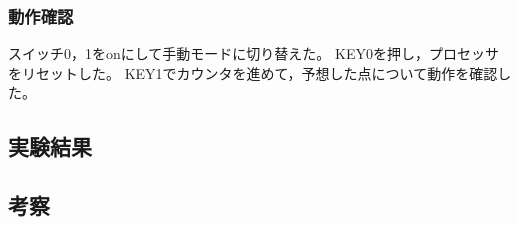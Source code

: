 \subsubsection{動作確認}
スイッチ0，1をonにして手動モードに切り替えた。
KEY0を押し，プロセッサをリセットした。
KEY1でカウンタを進めて，予想した点について動作を確認した。

\subsection{実験結果}

\subsection{考察}
